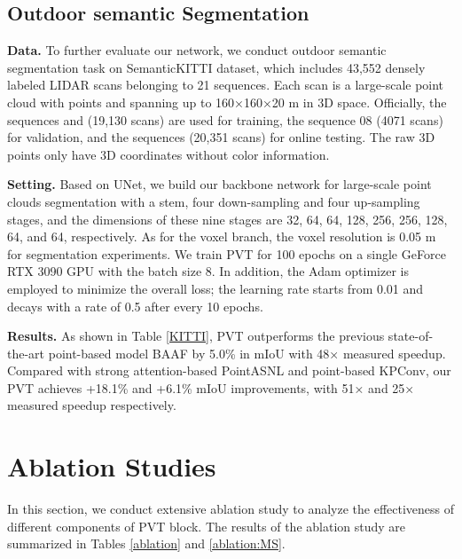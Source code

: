 \documentclass[10pt,twocolumn,letterpaper]{article}
\begin{document}
\subsection{Outdoor semantic Segmentation}
\textbf{Data.} To further evaluate our network, we conduct outdoor semantic segmentation task on SemanticKITTI \cite{semanticKT} dataset, which includes 43,552 densely labeled LIDAR scans belonging to 21 sequences. Each scan is a large-scale point cloud with  points and spanning up to 160×160×20 m in 3D space. Officially, the sequences  and  (19,130 scans) are used for training, the sequence 08 (4071 scans) for validation, and the sequences  (20,351 scans) for online testing. The raw 3D points only have 3D coordinates without color information. 

\textbf{Setting. }Based on UNet, we build our backbone network for large-scale point clouds segmentation with a stem, four down-sampling and four up-sampling stages, and the dimensions of these nine stages are 32, 64, 64, 128, 256, 256, 128, 64, and 64, respectively.
As for the voxel branch, the voxel resolution is 0.05 m for segmentation experiments.
We train PVT for 100 epochs on a single GeForce RTX 3090 GPU with the batch size 8. In addition, the Adam optimizer is employed to minimize the overall loss;
the learning rate starts from 0.01 and decays with a rate of 0.5 after every 10 epochs.


\textbf{Results.} As shown in Table \ref{KITTI}, PVT outperforms the previous state-of-the-art point-based model BAAF by 5.0\% in mIoU with 48× measured speedup. Compared with strong attention-based PointASNL and point-based KPConv, our PVT achieves +18.1\% and +6.1\% mIoU improvements, with 51× and 25× measured speedup respectively.

\section{Ablation Studies}
In this section, we conduct extensive ablation study to analyze the effectiveness of different components of PVT block. The results of the ablation study are summarized in Tables \ref{ablation} and \ref{ablation:MS}.
\end{document}

